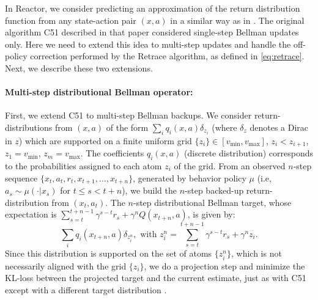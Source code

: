 \documentclass{article}
\begin{document}
In Reactor, we consider predicting an 
approximation of the return distribution function from any state-action pair 
$(x,a)$ in a similar way as in \citet{bellemare2017distributional}. The 
original 
algorithm C51 described in that paper considered single-step Bellman updates 
only. Here we need to extend this idea to multi-step updates 
and handle the off-policy correction performed by the Retrace algorithm, as 
defined in
\eqref{eq:retrace}. Next, we describe these two extensions.

\paragraph{Multi-step distributional Bellman operator:} First, we extend C51 to 
multi-step Bellman backups. We consider return-distributions from $(x,a)$ of the form 
$\sum_{i} q_i(x,a) \delta_{z_i}$ (where $\delta_z$ denotes a Dirac in $z$) 
which are supported on a finite uniform grid $\{z_i\}\in [v_{\min}, 
v_{\max}]$, $z_i < z_{i+1}$, $z_{1} = v_{\min}$, $z_{m} = v_{\max}$. 
The coefficients $q_i(x,a)$ (discrete distribution) corresponds to the 
probabilities assigned to each atom 
$z_i$ of the grid. From an observed $n$-step sequence $\{x_t,a_t, r_t, x_{t+1}, 
\dots, x_{t+n}\}$, generated by behavior policy $\mu$ 
(i.e, $a_s\sim\mu(\cdot|x_s)$ for $t \leq s<t+n$), we build the 
$n$-step backed-up return-distribution from $(x_t, a_t)$. The $n$-step distributional 
Bellman target, whose expectation is $\sum_{s=t}^{t+n-1} \gamma^{s-t} r_s + \gamma^n Q(x_{t+n},a)$, 
is given by:
$$\sum_{i} q_i(x_{t+n},a) \delta_{z_i^{n}}, \mbox{ with } z^{n}_i = 
\sum_{s=t}^{t+n-1}\gamma^{s-t} r_s + \gamma^n z_i.$$
Since this distribution is supported on the set of atoms $\{z^{n}_i\}$, which is 
not necessarily aligned with the grid 
$\{z_i\}$, we do a projection step and minimize the KL-loss between the projected 
target and the current estimate, just as with C51 except with a different target distribution \citep{bellemare2017distributional}.

\iffalse
Since this distribution is supported on the set of atoms $\{z^{n}_i\}$, which is 
not necessarily aligned with the grid 
$\{z_i\}$, we do a projection step and define 
the (aligned) target distribution:
$$\sum_{i} q^{n,a,*}_i(x_t,a_t) \delta_{z_i}, \mbox{ with } q^{n,a,*}_i(x_t,a_t) 
= 
\sum_{j} q^{n,a}_j(x_t,a_t) h_{z_i}(z^{n}_j),$$
where $h$ is a piecewise linear ('hat') function defined by
$$
h_{z_i}(z)=\left\{
\begin{array}{ll}
1 & ( z\leq z_1 \mbox{ and } i=1) \mbox{ or } ( z\geq z_1 \mbox{ and } i=n),\\
\frac{z-z_{i-1}}{z_i-z_{i-1}} & \mbox{ for } z_{i-1}\leq z\leq z_i, \\
\frac{z_{i+1}-z}{z_{i+1}-z_{i}} & \mbox{ for } z_{i}\leq z\leq z_{i+1}.
\end{array}
\right.
$$
Finally the current predicted (discrete) probabilities $\{q_i(x_t,a_t)\}$ are 
updated by 
performing a gradient step on the KL-loss between the (discrete) 
target distribution and the predicted one: $\nabla \mbox{KL}(q^{n,a,*}(x_t,a_t), 
q(x_t,a_t)) = -\sum_i 
q^{n,a,*}_i(x_t,a_t)\nabla \log q_i(x_t,a_t)$.
\fi
\end{document}

